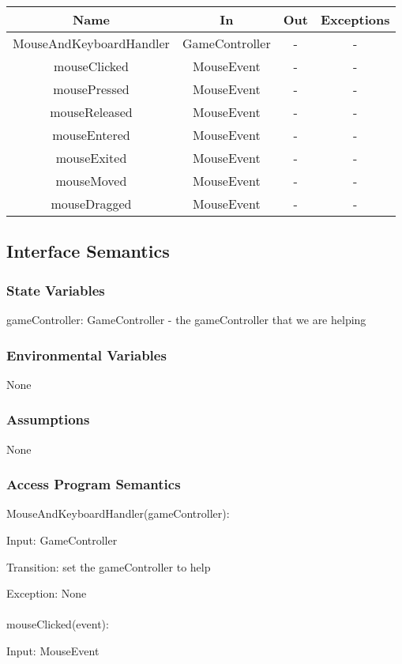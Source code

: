 \documentclass[12,english]{article}
\begin{document}
	\begin{tabular}[pos]{|c|c|c|c|}
	\hline
	\textbf{Name}& \textbf{In} & \textbf{Out} & \textbf{Exceptions} \\ 
	\hline
	MouseAndKeyboardHandler & GameController & - & - \\ \hline
	mouseClicked & MouseEvent & - & - \\ \hline
	mousePressed & MouseEvent & - & - \\ \hline
	mouseReleased & MouseEvent & - & - \\ \hline
	mouseEntered & MouseEvent & - & - \\ \hline
	mouseExited & MouseEvent & - & - \\ \hline
	mouseMoved & MouseEvent & - & - \\ \hline
	mouseDragged & MouseEvent & - & - \\ \hline
					
	\end{tabular}		
		
	\subsection{Interface Semantics}
		\subsubsection{State Variables}
		gameController: GameController - the gameController that we are helping
		\subsubsection{Environmental Variables}
		None
		\subsubsection{Assumptions}
        None

		\subsubsection{Access Program Semantics}
		MouseAndKeyboardHandler(gameController):
		
		Input: GameController
		
		Transition: set the gameController to help
		
		Exception: None\\
		\\
		mouseClicked(event):
		
		Input: MouseEvent
		
\end{document}
